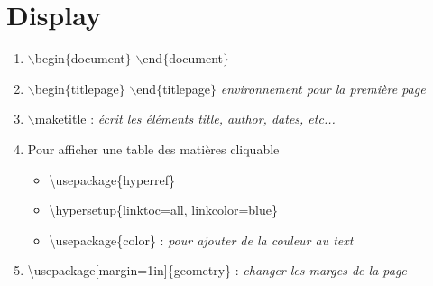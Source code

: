 \documentclass[12pt, letterpaper]{article}
\begin{document}
\section{Display}
\begin{enumerate}
\item $\backslash$begin$\lbrace$document$\rbrace$  $\backslash$end$\lbrace$document$\rbrace$
\item $\backslash$begin$\lbrace$titlepage$\rbrace$  $\backslash$end$\lbrace$titlepage$\rbrace$ \textit{environnement pour la première page}
\item $\backslash$maketitle : \textit{écrit les éléments title, author, dates, etc...}
\item Pour afficher une table des matières cliquable
\begin{itemize}
\item \textbackslash usepackage\{hyperref\}
\item \textbackslash hypersetup\{linktoc=all, linkcolor=blue\}
\item \textbackslash usepackage\{color\} : \textit{pour ajouter de la couleur au text}
\end{itemize}
\item \textbackslash usepackage[margin=1in]\{geometry\} : \textit{changer les marges de la page}
\end{enumerate}
\end{document}
